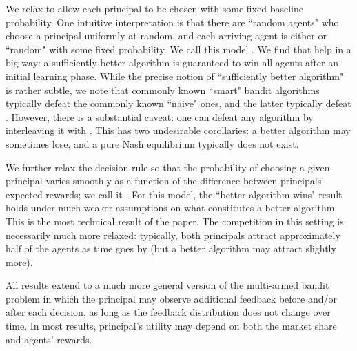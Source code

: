 We relax \HardMax to allow each principal to be chosen with some fixed baseline probability. One intuitive interpretation is that there are ``random agents" who choose a principal uniformly at random, and each arriving agent is either \HardMax or ``random" with some fixed probability. We call this model \HardMaxRandom. We find that  help in a big way: a sufficiently better algorithm is guaranteed to win all  agents after an initial learning phase. While the precise notion of ``sufficiently better algorithm" is rather subtle, we note that commonly known ``smart" bandit algorithms typically defeat the commonly known ``naive" ones, and the latter typically defeat \DynGreedy. However, there is a substantial caveat: one can defeat any algorithm by interleaving it with \DynGreedy. This has two undesirable corollaries: a better algorithm may sometimes lose, and a pure Nash equilibrium typically does not exist.

We further relax the decision rule so that the probability of choosing a given principal varies smoothly as a function of the difference between  principals' expected rewards; we call it \SoftMaxRandom. For this model, the ``better algorithm wins" result holds under much weaker assumptions on what constitutes a better algorithm. This is the most technical result of the paper. The competition in this setting is necessarily much more relaxed: typically, both principals attract approximately half of the agents as time goes by (but a better algorithm may attract slightly more).

All results extend to a much more general version of the multi-armed bandit problem in which the principal may observe additional feedback before and/or after each decision, as long as the feedback distribution does not change over time. In most results, principal's utility may depend on both the market share and agents' rewards.


